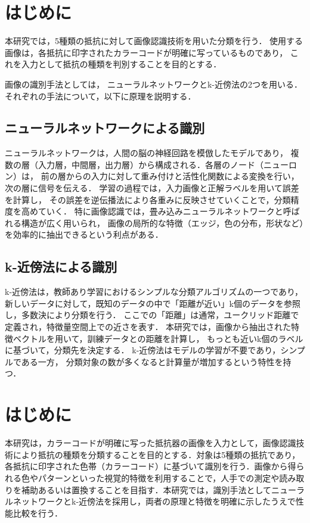 \section*{はじめに}
本研究では，5種類の抵抗に対して画像認識技術を用いた分類を行う．
使用する画像は，各抵抗に印字されたカラーコードが明確に写っているものであり，
これを入力として抵抗の種類を判別することを目的とする．

画像の識別手法としては，
ニューラルネットワークとk-近傍法の2つを用いる．
それぞれの手法について，以下に原理を説明する．

\subsection*{ニューラルネットワークによる識別}
ニューラルネットワークは，人間の脳の神経回路を模倣したモデルであり，
複数の層（入力層，中間層，出力層）から構成される．各層のノード（ニューロン）は，
前の層からの入力に対して重み付けと活性化関数による変換を行い，次の層に信号を伝える．
学習の過程では，入力画像と正解ラベルを用いて誤差を計算し，
その誤差を逆伝播法により各重みに反映させていくことで，分類精度を高めていく．
特に画像認識では，畳み込みニューラルネットワークと呼ばれる構造が広く用いられ，
画像の局所的な特徴（エッジ，色の分布，形状など）を効率的に抽出できるという利点がある．

\subsection*{k-近傍法による識別}
k-近傍法は，教師あり学習におけるシンプルな分類アルゴリズムの一つであり，
新しいデータに対して，既知のデータの中で「距離が近い」k個のデータを参照し，多数決により分類を行う．
ここでの「距離」は通常，ユークリッド距離で定義され，特徴量空間上での近さを表す．
本研究では，画像から抽出された特徴ベクトルを用いて，訓練データとの距離を計算し，
もっとも近いk個のラベルに基づいて，分類先を決定する．
k-近傍法はモデルの学習が不要であり，シンプルである一方，
分類対象の数が多くなると計算量が増加するという特性を持つ．






\section*{はじめに}
本研究は，カラーコードが明確に写った抵抗器の画像を入力として，画像認識技術により抵抗の種類を分類することを目的とする．対象は5種類の抵抗であり，各抵抗に印字された色帯（カラーコード）に基づいて識別を行う．画像から得られる色やパターンといった視覚的特徴を利用することで，人手での測定や読み取りを補助あるいは置換することを目指す．本研究では，識別手法としてニューラルネットワークとk-近傍法を採用し，両者の原理と特徴を明確に示したうえで性能比較を行う．


